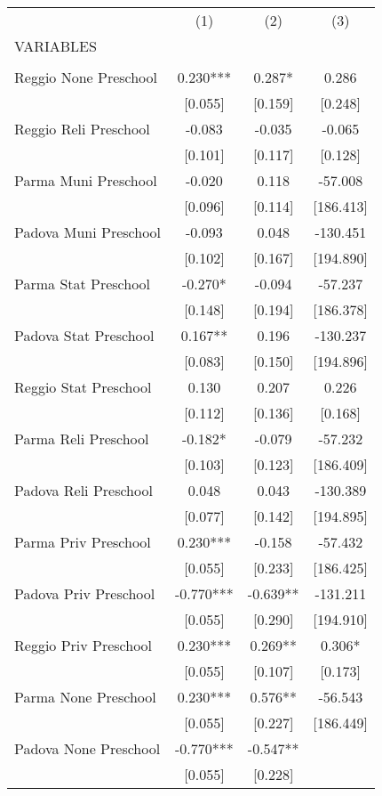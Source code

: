 \begin{tabular}{lccc} \hline
 & (1) & (2) & (3) \\
VARIABLES &  &  &  \\ \hline
 &  &  &  \\
Reggio None Preschool & 0.230*** & 0.287* & 0.286 \\
 & [0.055] & [0.159] & [0.248] \\
Reggio Reli Preschool & -0.083 & -0.035 & -0.065 \\
 & [0.101] & [0.117] & [0.128] \\
Parma Muni Preschool & -0.020 & 0.118 & -57.008 \\
 & [0.096] & [0.114] & [186.413] \\
Padova Muni Preschool & -0.093 & 0.048 & -130.451 \\
 & [0.102] & [0.167] & [194.890] \\
Parma Stat Preschool & -0.270* & -0.094 & -57.237 \\
 & [0.148] & [0.194] & [186.378] \\
Padova Stat Preschool & 0.167** & 0.196 & -130.237 \\
 & [0.083] & [0.150] & [194.896] \\
Reggio Stat Preschool & 0.130 & 0.207 & 0.226 \\
 & [0.112] & [0.136] & [0.168] \\
Parma Reli Preschool & -0.182* & -0.079 & -57.232 \\
 & [0.103] & [0.123] & [186.409] \\
Padova Reli Preschool & 0.048 & 0.043 & -130.389 \\
 & [0.077] & [0.142] & [194.895] \\
Parma Priv Preschool & 0.230*** & -0.158 & -57.432 \\
 & [0.055] & [0.233] & [186.425] \\
Padova Priv Preschool & -0.770*** & -0.639** & -131.211 \\
 & [0.055] & [0.290] & [194.910] \\
Reggio Priv Preschool & 0.230*** & 0.269** & 0.306* \\
 & [0.055] & [0.107] & [0.173] \\
Parma None Preschool & 0.230*** & 0.576** & -56.543 \\
 & [0.055] & [0.227] & [186.449] \\
Padova None Preschool & -0.770*** & -0.547** &  \\
 & [0.055] & [0.228] &  \\

\end{tabular}
